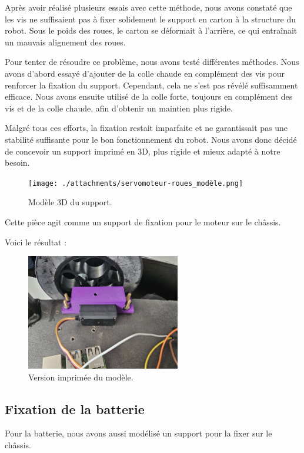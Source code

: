 \documentclass[a4paper,12pt]{report}  %
\begin{document}
Après avoir réalisé plusieurs essais avec cette méthode, nous avons constaté que les vis ne suffisaient pas à fixer solidement le support en carton à la structure du robot. Sous le poids des roues, le carton se déformait à l’arrière, ce qui entraînait un mauvais alignement des roues.

Pour tenter de résoudre ce problème, nous avons testé différentes méthodes. Nous avons d’abord essayé d’ajouter de la colle chaude en complément des vis pour renforcer la fixation du support. Cependant, cela ne s’est pas révélé suffisamment efficace. Nous avons ensuite utilisé de la colle forte, toujours en complément des vis et de la colle chaude, afin d’obtenir un maintien plus rigide.

Malgré tous ces efforts, la fixation restait imparfaite et ne garantissait pas une stabilité suffisante pour le bon fonctionnement du robot. Nous avons donc décidé de concevoir un support imprimé en 3D, plus rigide et mieux adapté à notre besoin.

\begin{figure}[H]
	\centering
	\texttt{[image: ./attachments/servomoteur-roues\_modèle.png]}
	\caption{Modèle 3D du support.}
\end{figure}

Cette pièce agit comme un support de fixation pour le moteur sur le châssis.

Voici le résultat : 

\begin{figure}[H]
	\centering
	\includegraphics[width=0.6\textwidth]{./attachments/servomoteur-roues_impression.jpg}
	\caption{Version imprimée du modèle.}
\end{figure}

\subsection{Fixation de la batterie}
Pour la batterie, nous avons aussi modélisé un support pour la fixer sur le châssis.
\end{document}
